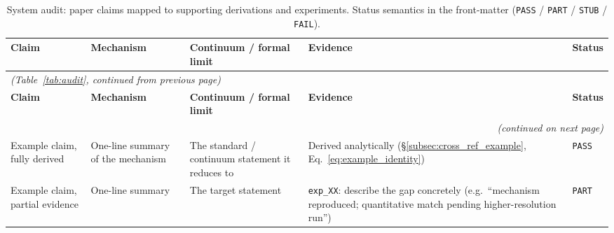 %
%
%

\label{tab:audit}

{\scriptsize
\setlength{\tabcolsep}{4pt}
\renewcommand{\arraystretch}{0.95}
\begin{longtable}{@{}p{2.6cm}p{3.8cm}p{3.2cm}p{4.4cm}p{1.0cm}@{}}
\caption{\small System audit: paper claims mapped to supporting
derivations and experiments.  Status semantics in the front-matter
(\texttt{PASS} / \texttt{PART} / \texttt{STUB} / \texttt{FAIL}).}
\label{tab:audit_caption} \\
\hline
\textbf{Claim} & \textbf{Mechanism} & \textbf{Continuum / formal limit} & \textbf{Evidence} & \textbf{Status} \\
\hline
\endfirsthead

\multicolumn{5}{l}{\textit{(Table~\ref{tab:audit}, continued from previous page)}} \\
\hline
\textbf{Claim} & \textbf{Mechanism} & \textbf{Continuum / formal limit} & \textbf{Evidence} & \textbf{Status} \\
\hline
\endhead

\hline
\multicolumn{5}{r}{\textit{(continued on next page)}} \\
\endfoot

\hline
\endlastfoot

Example claim, fully derived
    & One-line summary of the mechanism
    & The standard / continuum statement it reduces to
    & Derived analytically (\S\ref{subsec:cross_ref_example}, Eq.~\ref{eq:example_identity})
    & \texttt{PASS} \\

Example claim, partial evidence
    & One-line summary
    & The target statement
    & \texttt{exp\_XX}: describe the gap concretely (e.g.\ ``mechanism
      reproduced; quantitative match pending higher-resolution run'')
    & \texttt{PART} \\

\hline
\end{longtable}
}
